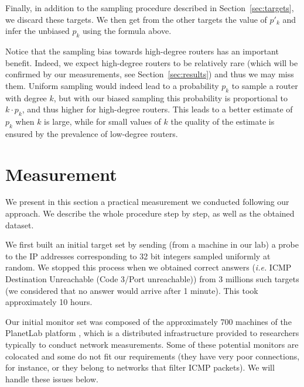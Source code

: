 \documentclass[conference]{IEEEtran}
\begin{document}
Finally, in addition to the sampling procedure described in Section~\ref{sec:targets}, we discard these targets. We then get from the other targets the value of $p'_k$ and infer the unbiased $p_k$ using the formula above.

Notice that the sampling bias towards high-degree routers has an important benefit. Indeed, we expect high-degree routers to be relatively rare (which will be confirmed by our measurements, see Section~\ref{sec:results}) and thus we may miss them. Uniform sampling would indeed lead to a probability $p_k$ to sample a router with degree $k$, but with our biased sampling this probability is proportional to $k\cdot p_k$, and thus higher for high-degree routers. This leads to a better estimate of $p_k$ when $k$ is large, while for small values of $k$ the quality of the estimate is ensured by the prevalence of low-degree routers.


\section{Measurement} \label{sec:measurement}
\label{sec:data-collection}
\label{sec:data-cleaning-filtering}

We present in this section a practical measurement we conducted following our approach. We describe the whole procedure step by step, as well as the obtained dataset.

We first built an initial target set by sending (from a machine in our lab) a probe to the IP addresses corresponding to 32 bit integers sampled uniformly at random. We stopped this process when we obtained correct answers ({\em i.e.} ICMP Destination Unreachable (Code 3/Port unreachable)) from 3 millions such targets (we considered that no answer would arrive after 1 minute). This took approximately 10 hours.

Our initial monitor set was composed of the approximately 700 machines of the PlanetLab platform \cite{planetlab}, which is a distributed infrastructure provided to researchers typically to conduct network measurements. Some of these potential monitors are colocated and some do not fit our requirements (they have very poor connections, for instance, or they belong to networks that filter ICMP packets). We will handle these issues below.
\end{document}
